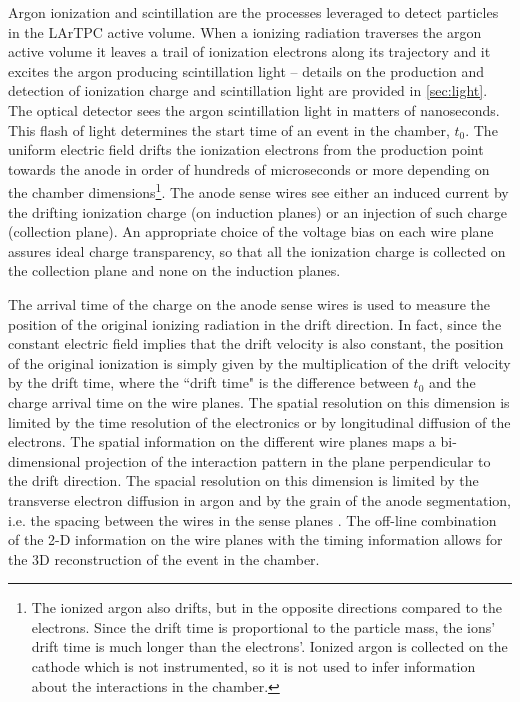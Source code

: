 Argon ionization and scintillation are the processes leveraged to detect particles in the LArTPC active volume.  When a ionizing radiation traverses the argon active volume it leaves a trail of ionization electrons along its trajectory and it excites the argon producing scintillation light -- details on the production and detection of ionization charge and scintillation light are provided in \ref{sec:light}. The optical detector sees the argon scintillation light in matters of nanoseconds. This flash of light determines the start time of an event in the chamber, $t_0$. The uniform electric field drifts the ionization  electrons from the production point towards the anode in order of hundreds of microseconds or more depending on the chamber dimensions\footnote{The ionized argon also drifts, but  in the opposite directions compared to the electrons. Since the drift time is proportional to the particle mass,  the ions' drift time is much longer than the electrons'.  Ionized argon is collected on the cathode which is not instrumented, so it is not used to infer information about the interactions in the chamber.}. The anode sense wires see either an induced current by the drifting ionization charge (on induction planes) or an injection of such charge (collection plane).    An appropriate choice of the voltage bias on each wire plane assures ideal charge transparency, so that all the ionization charge is collected on the collection plane and none on the induction planes.  

The arrival time of the charge on the anode sense wires is used to measure the position of the original ionizing radiation in the drift direction. In fact, since the constant electric field implies that the drift velocity is also constant, the position of the original ionization is simply given by the multiplication of the drift velocity by the drift time, where the ``drift time" is the difference between $t_0$ and the charge arrival time on the wire planes. The spatial resolution on this dimension is limited by the time resolution of the electronics or by longitudinal diffusion of the electrons.
The spatial information on the different wire planes maps a bi-dimensional projection of the interaction pattern in the plane perpendicular to the drift direction. The spacial resolution on this dimension is limited by the transverse electron diffusion in argon and by the grain of the anode segmentation, i.e. the spacing between the wires in the sense planes \cite{DERENZO1974319}.  The off-line combination of the 2-D information on the wire planes with the timing information allows for the 3D reconstruction of the event in the chamber.

